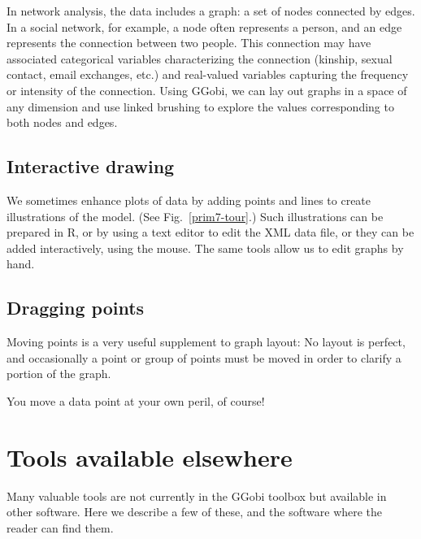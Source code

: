 In network analysis, the data includes a graph: a set of nodes
connected by edges.  In a social network, for example, a node often
represents a person, and an edge represents the connection between two
people.  This connection may have associated categorical variables
characterizing the connection (kinship, sexual contact, email
exchanges, etc.) and real-valued variables capturing the frequency or
intensity of the connection.  Using GGobi, we can lay out graphs in a
space of any dimension and use linked brushing to explore the values
corresponding to both nodes and edges.

\subsection{Interactive drawing}


We sometimes enhance plots of data by adding points and lines to
create illustrations of the model.  (See Fig.~\ref{prim7-tour}.)  Such
illustrations can be prepared in R, or by using a text editor to edit
the XML\textsuperscript{\textregistered} data file, or they can be
added interactively, using the mouse.  The same tools allow us to edit
graphs by hand.

\subsection{Dragging points}


Moving points is a very useful supplement to graph layout: No layout
is perfect, and occasionally a point or group of points must be moved
in order to clarify a portion of the graph.  

You move a data point at your own peril, of course!


\section{Tools available elsewhere}

Many valuable tools are not currently in the GGobi toolbox but
available in other software. Here we describe a few of these, and the
software where the reader can find them.

